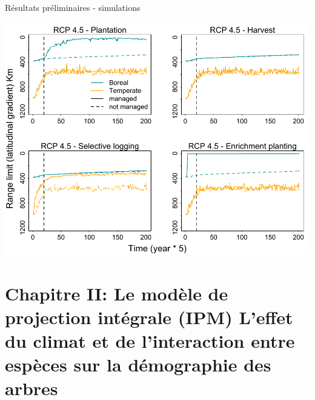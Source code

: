 \documentclass[11pt, compress, aspectratio=1610]{beamer}
\begin{document}
\begin{frame}{Résultats préliminaires - simulations}
\protect\hypertarget{ruxe9sultats-pruxe9liminaires---simulations-1}{}

\vspace*{-6mm}
\centering

\includegraphics[scale=0.65]{figures/resultSim.pdf}

\par

\end{frame}

\hypertarget{chapitre-ii-le-moduxe8le-de-projection-intuxe9grale-ipm-leffet-du-climat-et-de-linteraction-entre-espuxe8ces-sur-la-duxe9mographie-des-arbres}{%
\section{\texorpdfstring{Chapitre II: \newline Le modèle de projection
intégrale (IPM) \newline \large L’effet du climat et de l’interaction
entre espèces sur la démographie des
arbres}{Chapitre II: Le modèle de projection intégrale (IPM) L’effet du climat et de l’interaction entre espèces sur la démographie des arbres}}\label{chapitre-ii-le-moduxe8le-de-projection-intuxe9grale-ipm-leffet-du-climat-et-de-linteraction-entre-espuxe8ces-sur-la-duxe9mographie-des-arbres}}
\end{document}
